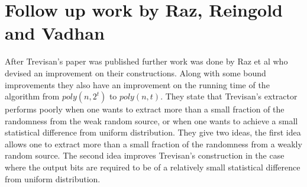 \section{Follow up work by Raz, Reingold and Vadhan}
After Trevisan's paper was published further work was done by Raz et al \cite{Raz:2002:ERR:637554.637559} who devised an improvement on their constructions. Along with some bound improvements they also have an improvement on the running time of the algorithm from $poly(n,2^t)$ to $poly(n,t)$. They state that Trevisan’s extractor performs poorly when one wants to extract more than a small fraction of the randomness from the weak random source, or when one wants to achieve a small statistical difference from uniform distribution. They give two ideas, the first idea allows one to extract more than a small fraction of the randomness from a weakly random source. The second idea improves Trevisan’s construction in the case where the output bits are required to be of a relatively small statistical difference from uniform distribution.